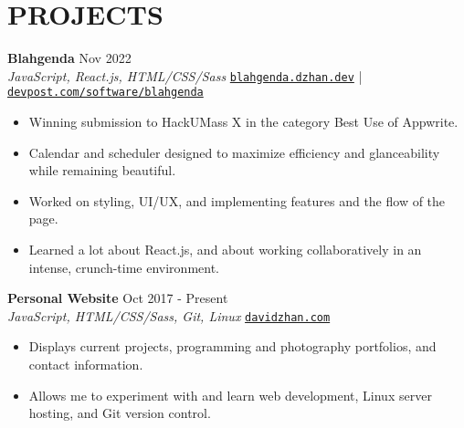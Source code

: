 \documentclass[letterpaper,10pt]{extarticle}
\begin{document}

\section*{PROJECTS}
\noindent
\textbf{Blahgenda} \hfill Nov 2022\\ %
\textit{JavaScript, React.js, HTML/CSS/Sass} \hfill \texttt{\href{https://blahgenda.dzhan.dev}{blahgenda.dzhan.dev}} | \texttt{\href{https://devpost.com/software/blahgenda}{devpost.com/software/blahgenda}}
\begin{itemize}
    \item Winning submission to HackUMass X in the category Best Use of Appwrite.
    \item Calendar and scheduler designed to maximize efficiency and glanceability while remaining beautiful.
    \item Worked on styling, UI/UX, and implementing features and the flow of the page.
    \item Learned a lot about React.js, and about working collaboratively in an intense, crunch-time environment.
\end{itemize}

\noindent
\textbf{Personal Website} \hfill Oct 2017 - Present\\ %
\textit{JavaScript, HTML/CSS/Sass, Git, Linux} \hfill \texttt{\href{https://davidzhan.com}{davidzhan.com}} %
\begin{itemize}
    \item Displays current projects, programming and photography portfolios, and contact information.
    \item Allows me to experiment with and learn web development, Linux server hosting, and Git version control. %
\end{itemize}
\end{document}
